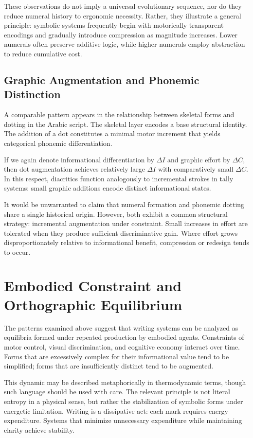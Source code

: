 \documentclass[11pt]{article}
\begin{document}
These observations do not imply a universal evolutionary sequence, nor do they reduce numeral history to ergonomic necessity. Rather, they illustrate a general principle: symbolic systems frequently begin with motorically transparent encodings and gradually introduce compression as magnitude increases. Lower numerals often preserve additive logic, while higher numerals employ abstraction to reduce cumulative cost.

\subsection{Graphic Augmentation and Phonemic Distinction}

A comparable pattern appears in the relationship between skeletal forms and dotting in the Arabic script. The skeletal layer encodes a base structural identity. The addition of a dot constitutes a minimal motor increment that yields categorical phonemic differentiation.

If we again denote informational differentiation by $\Delta I$ and graphic effort by $\Delta C$, then dot augmentation achieves relatively large $\Delta I$ with comparatively small $\Delta C$. In this respect, diacritics function analogously to incremental strokes in tally systems: small graphic additions encode distinct informational states.

It would be unwarranted to claim that numeral formation and phonemic dotting share a single historical origin. However, both exhibit a common structural strategy: incremental augmentation under constraint. Small increases in effort are tolerated when they produce sufficient discriminative gain. Where effort grows disproportionately relative to informational benefit, compression or redesign tends to occur.

\section{Embodied Constraint and Orthographic Equilibrium}

The patterns examined above suggest that writing systems can be analyzed as equilibria formed under repeated production by embodied agents. Constraints of motor control, visual discrimination, and cognitive economy interact over time. Forms that are excessively complex for their informational value tend to be simplified; forms that are insufficiently distinct tend to be augmented.

This dynamic may be described metaphorically in thermodynamic terms, though such language should be used with care. The relevant principle is not literal entropy in a physical sense, but rather the stabilization of symbolic forms under energetic limitation. Writing is a dissipative act: each mark requires energy expenditure. Systems that minimize unnecessary expenditure while maintaining clarity achieve stability.
\end{document}
